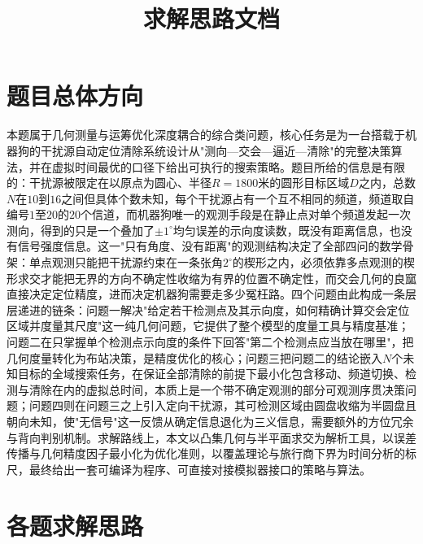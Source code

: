 \documentclass[12pt,a4paper]{ctexart}
\title{\vspace{-2cm}\textbf{\Huge 求解思路文档}}
\author{}
\date{}
\begin{document}
\maketitle
\vspace{-1.5cm}

\section{题目总体方向}

本题属于几何测量与运筹优化深度耦合的综合类问题，核心任务是为一台搭载于机器狗的干扰源自动定位清除系统设计从"测向—交会—逼近—清除"的完整决策算法，并在虚拟时间最优的口径下给出可执行的搜索策略。题目所给的信息是有限的：干扰源被限定在以原点为圆心、半径$R=1800$米的圆形目标区域$D$之内，总数$N$在$10$到$16$之间但具体个数未知，每个干扰源占有一个互不相同的频道，频道取自编号$1$至$20$的$20$个信道，而机器狗唯一的观测手段是在静止点对单个频道发起一次测向，得到的只是一个叠加了$\pm1^\circ$均匀误差的示向度读数，既没有距离信息，也没有信号强度信息。这一"只有角度、没有距离"的观测结构决定了全部四问的数学骨架：单点观测只能把干扰源约束在一条张角$2^\circ$的楔形之内，必须依靠多点观测的楔形求交才能把无界的方向不确定性收缩为有界的位置不确定性，而交会几何的良窳直接决定定位精度，进而决定机器狗需要走多少冤枉路。四个问题由此构成一条层层递进的链条：问题一解决"给定若干检测点及其示向度，如何精确计算交会定位区域并度量其尺度"这一纯几何问题，它提供了整个模型的度量工具与精度基准；问题二在只掌握单个检测点示向度的条件下回答"第二个检测点应当放在哪里"，把几何度量转化为布站决策，是精度优化的核心；问题三把问题二的结论嵌入$N$个未知目标的全域搜索任务，在保证全部清除的前提下最小化包含移动、频道切换、检测与清除在内的虚拟总时间，本质上是一个带不确定观测的部分可观测序贯决策问题；问题四则在问题三之上引入定向干扰源，其可检测区域由圆盘收缩为半圆盘且朝向未知，使"无信号"这一反馈从确定信息退化为三义信息，需要额外的方位冗余与背向判别机制。求解路线上，本文以凸集几何与半平面求交为解析工具，以误差传播与几何精度因子最小化为优化准则，以覆盖理论与旅行商下界为时间分析的标尺，最终给出一套可编译为程序、可直接对接模拟器接口的策略与算法。

\section{各题求解思路}
\end{document}
